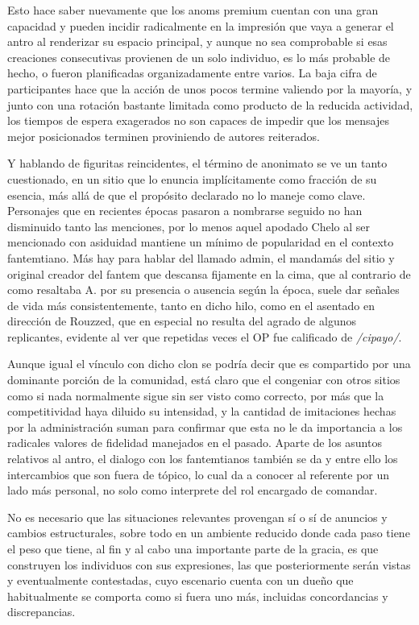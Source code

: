 \documentclass[
]{book}
\begin{document}
Esto hace saber nuevamente que los anoms premium cuentan con una gran capacidad y pueden incidir radicalmente en la impresión que vaya a generar el antro al renderizar su espacio principal, y aunque no sea comprobable si esas creaciones consecutivas provienen de un solo individuo, es lo más probable de hecho, o fueron planificadas organizadamente entre varios. La baja cifra de participantes hace que la acción de unos pocos termine valiendo por la mayoría, y junto con una rotación bastante limitada como producto de la reducida actividad, los tiempos de espera exagerados no son capaces de impedir que los mensajes mejor posicionados terminen proviniendo de autores reiterados.

Y hablando de figuritas reincidentes, el término de anonimato se ve un tanto cuestionado, en un sitio que lo enuncia implícitamente como fracción de su esencia, más allá de que el propósito declarado no lo maneje como clave. Personajes que en recientes épocas pasaron a nombrarse seguido no han disminuido tanto las menciones, por lo menos aquel apodado Chelo al ser mencionado con asiduidad mantiene un mínimo de popularidad en el contexto fantemtiano. Más hay para hablar del llamado admin, el mandamás del sitio y original creador del fantem que descansa fijamente en la cima, que al contrario de como resaltaba A. por su presencia o ausencia según la época, suele dar señales de vida más consistentemente, tanto en dicho hilo, como en el asentado en dirección de Rouzzed, que en especial no resulta del agrado de algunos replicantes, evidente al ver que repetidas veces el OP fue calificado de \emph{/cipayo/}.

Aunque igual el vínculo con dicho clon se podría decir que es compartido por una dominante porción de la comunidad, está claro que el congeniar con otros sitios como si nada normalmente sigue sin ser visto como correcto, por más que la competitividad haya diluido su intensidad, y la cantidad de imitaciones hechas por la administración suman para confirmar que esta no le da importancia a los radicales valores de fidelidad manejados en el pasado. Aparte de los asuntos relativos al antro, el dialogo con los fantemtianos también se da y entre ello los intercambios que son fuera de tópico, lo cual da a conocer al referente por un lado más personal, no solo como interprete del rol encargado de comandar.

No es necesario que las situaciones relevantes provengan sí o sí de anuncios y cambios estructurales, sobre todo en un ambiente reducido donde cada paso tiene el peso que tiene, al fin y al cabo una importante parte de la gracia, es que construyen los individuos con sus expresiones, las que posteriormente serán vistas y eventualmente contestadas, cuyo escenario cuenta con un dueño que habitualmente se comporta como si fuera uno más, incluidas concordancias y discrepancias.
\end{document}
